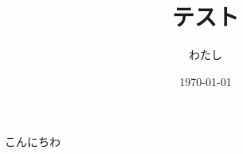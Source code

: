 \documentclass[a4paper,11pt]{jsarticle}
\begin{document}
\title{テスト}
\author{わたし}
\date{\today}
\maketitle


こんにちわ
\end{document}
